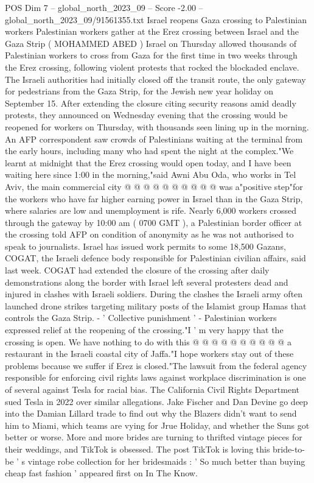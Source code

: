 \begin{textsample}{POS Dim 7 – global\_north\_2023\_09 – Score -2.00 – global\_north\_2023\_09/91561355.txt}  \label{ex:f7_pos_286}
Israel reopens Gaza crossing to Palestinian workers Palestinian workers gather at the Erez crossing between Israel and the Gaza Strip ( MOHAMMED ABED ) Israel on Thursday allowed thousands of Palestinian workers to cross from Gaza for the first time in two weeks through the Erez crossing, following violent protests that rocked the blockaded enclave.
The Israeli authorities had initially closed off the transit route, the only gateway for pedestrians from the Gaza Strip, for the Jewish new year holiday on September 15.
After extending the closure citing security reasons amid deadly protests, they announced on Wednesday evening that the crossing would be reopened for workers on Thursday, with thousands seen lining up in the morning.
An AFP correspondent saw crowds of Palestinians waiting at the terminal from the early hours, including many who had spent the night at the complex."We learnt at midnight that the Erez crossing would open today, and I have been waiting here since 1:00 in the morning,"said Awni Abu Oda, who works in Tel Aviv, the main commercial city @ @ @ @ @ @ @ @ @ @ was a"positive step"for the workers who have far higher earning power in Israel than in the Gaza Strip, where salaries are low and unemployment is rife.
Nearly 6,000 workers crossed through the gateway by 10:00 am ( 0700 GMT ), a Palestinian border officer at the crossing told AFP on condition of anonymity as he was not authorised to speak to journalists.
Israel has issued work permits to some 18,500 Gazans, COGAT, the Israeli defence body responsible for Palestinian civilian affairs, said last week.
COGAT had extended the closure of the crossing after daily demonstrations along the border with Israel left several protesters dead and injured in clashes with Israeli soldiers.
During the clashes the Israeli army often launched drone strikes targeting military posts of the Islamist group Hamas that controls the Gaza Strip. - ' Collective punishment ' - Palestinian workers expressed relief at the reopening of the crossing."I ' m very happy that the crossing is open.
We have nothing to do with this @ @ @ @ @ @ @ @ @ @ a restaurant in the Israeli coastal city of Jaffa."I hope workers stay out of these problems because we suffer if Erez is closed."The lawsuit from the federal agency responsible for enforcing civil rights laws against workplace discrimination is one of several against Tesla for racial bias.
The California Civil Rights Department sued Tesla in 2022 over similar allegations.
Jake Fischer and Dan Devine go deep into the Damian Lillard trade to find out why the Blazers didn't want to send him to Miami, which teams are vying for Jrue Holiday, and whether the Suns got better or worse.
More and more brides are turning to thrifted vintage pieces for their weddings, and TikTok is obsessed.
The post TikTok is loving this bride-to-be ' s vintage robe collection for her bridesmaids : ' So much better than buying cheap fast fashion ' appeared first on In The Know.

\end{textsample}
